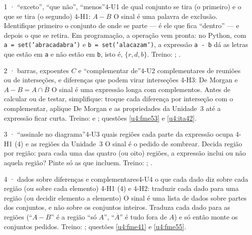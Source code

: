 \begin{caso}{1 · \enquote{exceto}, \enquote{que não}, \enquote{menos}}{4-U1}
{de qual conjunto se tira (o primeiro) e o que se tira (o segundo)}
{4-H1: $A-B$}
\reconhecer O sinal é uma palavra de exclusão. Identifique primeiro o conjunto de onde se parte — é ele que fica \enquote{dentro} — e depois o que se retira. Em programação, a operação vem pronta: no Python, com \texttt{a = set('abracadabra')} e \texttt{b = set('alacazam')}, a expressão \texttt{a - b} dá as letras que estão em \texttt{a} e não estão em \texttt{b}, isto é, $\{r,d,b\}$. Treino: ; .
\end{caso}

\begin{caso}{2 · barras, expoentes $C$ e \enquote{complementar de}}{4-U2}
{complementares de reuniões ou de interseções, e diferenças que podem virar interseções}
{4-H3: De Morgan e $A-B=A\cap\overline{B}$}
\reconhecer O sinal é uma expressão longa com complementos. Antes de calcular ou de testar, simplifique: troque cada diferença por interseção com o complementar, aplique De Morgan e as propriedades da Unidade~3 até a expressão ficar curta. Treino:  e ; questões \ref{u4:fme53} e \ref{u4:ita42}.
\end{caso}

\begin{caso}{3 · \enquote{assinale no diagrama}}{4-U3}
{quais regiões cada parte da expressão ocupa}
{4-H1 (4) e as regiões da Unidade~3}
\reconhecer O sinal é o pedido de sombrear. Decida região por região: para cada uma das quatro (ou oito) regiões, a expressão inclui ou não aquela região? Pinte só as que incluem. Treino: ; .
\end{caso}

\begin{caso}{4 · dados sobre diferenças e complementares}{4-U4}
{o que cada dado diz sobre cada região (ou sobre cada elemento)}
{4-H1 (4) e 4-H2: traduzir cada dado para uma região (ou decidir elemento a elemento)}
\reconhecer O sinal é uma lista de dados sobre partes dos conjuntos, e não sobre os conjuntos inteiros. Traduza cada dado para as regiões (\enquote{$A-B$} é a região \enquote{só $A$}, \enquote{$\overline{A}$} é tudo fora de $A$) e só então monte os conjuntos pedidos. Treino: ; questões \ref{u4:fme41} e \ref{u4:fme55}.
\end{caso}

